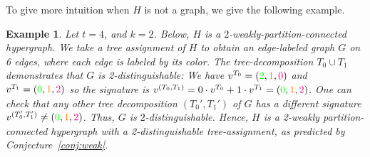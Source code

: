 \documentclass[11pt]{article}
\newtheorem{example}[theorem]{Example}
\newcommand\orange[1]{{\color{orange} #1}}
\newcommand\green[1]{{\color{green} #1}}
\newcommand\magenta[1]{{\color{magenta} #1}}
\begin{document}
To give more intuition when $H$ is not a graph, we give the following example.
\begin{example}\label{ex:1}
  Let $t=4$, and $k=2$.
  Below, $H$ is a $2$-weakly-partition-connected hypergraph.
  We take a tree assignment of $H$ to obtain an edge-labeled graph $G$ on 6 edges, where each edge is labeled by its color.
  The tree-decomposition $T_0\cup T_1$ demonstrates that $G$ is 2-distinguishable:
  We have $v^{T_0} = (\green{2},\orange{1},\magenta{0})$ and $v^{T_1}=(\green{0},\orange{1},\magenta{2})$ so the signature is $v^{(T_0,T_1)} = 0\cdot v^{T_0}+1\cdot v^{T_1} = (\green{0},\orange{1},\magenta{2})$.
  One can check that any other tree decomposition $(T_0',T_1')$ of $G$ has a different signature  $v^{(T_0',T_1')} \neq (\green{0},\orange{1},\magenta{2})$.
  Thus, $G$ is $2$-distinguishable.
  Hence, $H$ is a 2-weakly partition-connected hypergraph with a 2-distinguishable tree-assignment, as predicted by Conjecture~\ref{conj:weak}.
  \begin{center}
\end{center}
\end{example}
\end{document}
